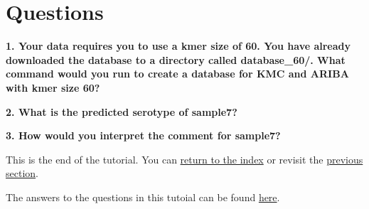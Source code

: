 \documentclass[11pt]{article}
\begin{document}
\hypertarget{questions}{%
\section{Questions}\label{questions}}

\textbf{1. Your data requires you to use a kmer size of 60. You have
already downloaded the database to a directory called database\_60/.
What command would you run to create a database for KMC and ARIBA with
kmer size 60?}

\textbf{2. What is the predicted serotype of sample7?}

\textbf{3. How would you interpret the comment for sample7?}

This is the end of the tutorial. You can \href{index.ipynb}{return to
the index} or revisit the \href{run_seroba.ipynb}{previous section}.

The answers to the questions in this tutoial can be found
\href{Answers.ipynb}{here}.


\end{document}
